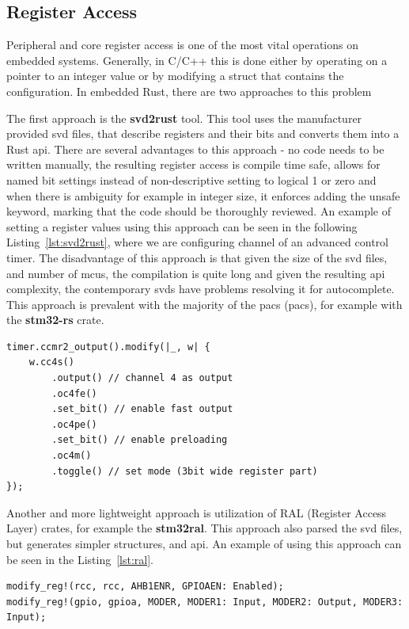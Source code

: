 \subsection{Register Access}
\label{subsec:register_access}
Peripheral and core register access is one of the most vital operations on embedded systems.
Generally, in C/C++ this is done either by operating on a pointer to an integer value or by modifying a struct that contains the configuration.
In embedded Rust, there are two approaches to this problem

The first approach is the \textbf{svd2rust}\cite{rust_embedded_devices_wg_rust-embeddedsvd2rust_2021} tool.
This tool uses the manufacturer provided \acs{svd} files, that describe registers and their bits and converts them into a Rust \acs{api}.
There are several advantages to this approach - no code needs to be written manually, the resulting register access is compile time safe, allows for named bit settings instead of non-descriptive setting to logical 1 or zero and when there is ambiguity for example in integer size, it enforces adding the unsafe keyword, marking that the code should be thoroughly reviewed.
An example of setting a register values using this approach can be seen in the following Listing~\ref{lst:svd2rust}, where we are configuring channel of an advanced control timer.
The disadvantage of this approach is that given the size of the \acs{svd} files, and number of \acs{mcu}s, the compilation is quite long and given the resulting \acs{api} complexity, the contemporary \acs{svd}s have problems resolving it for autocomplete.
This approach is prevalent with the majority of the \acs{pac}s (\acl{pac}s), for example with the \textbf{stm32-rs} crate\cite{noauthor_stm32-rsstm32-rs_2021}.

\begin{lstlisting}[caption={Using svd2rust generated API for register access.},label=lst:svd2rust]
timer.ccmr2_output().modify(|_, w| {
    w.cc4s()
        .output() // channel 4 as output
        .oc4fe()
        .set_bit() // enable fast output
        .oc4pe()
        .set_bit() // enable preloading
        .oc4m()
        .toggle() // set mode (3bit wide register part)
});
\end{lstlisting}

Another and more lightweight approach is utilization of RAL (Register Access Layer) crates, for example the \textbf{stm32ral}\cite{greig_adamgreigstm32ral_2021}.
This approach also parsed the \acs{svd} files, but generates simpler structures, and \acs{api}.
An example of using this approach can be seen in the Listing~\ref{lst:ral}.
\begin{lstlisting}[caption={Using RAL API for register access\cite{greig_adamgreigstm32ral_2021}.},label=lst:ral]
modify_reg!(rcc, rcc, AHB1ENR, GPIOAEN: Enabled);
modify_reg!(gpio, gpioa, MODER, MODER1: Input, MODER2: Output, MODER3: Input);
\end{lstlisting}

